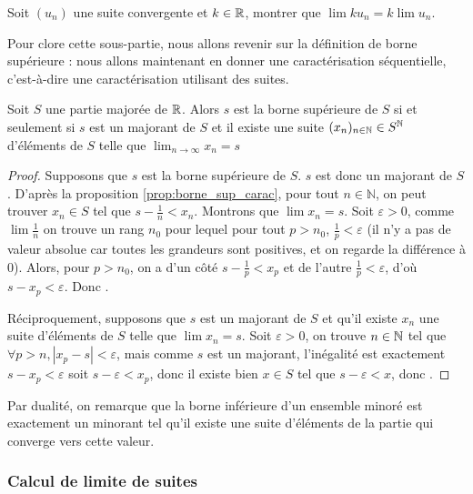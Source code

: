 \begin{exo}
    Soit $(u_n)$ une suite convergente et $k\in\mathbb{R}$, montrer que $\lim k u_n = k \lim u_n$.
\end{exo}

Pour clore cette sous-partie, nous allons revenir sur la définition de borne supérieure : nous allons maintenant en donner une caractérisation séquentielle, c'est-à-dire une caractérisation utilisant des suites.

\begin{prop}
    Soit $S$ une partie majorée de $\mathbb{R}$. Alors $s$ est la borne supérieure de $S$ si et seulement si $s$ est un majorant de $S$ et il existe une suite $(x_n)_{n\in\mathbb{N}}\in S^{\mathbb{N}}$ d'éléments de $S$ telle que $\displaystyle{\lim_{n\to\infty} x_n = s}$
\end{prop}

\begin{proof}
    Supposons que $s$ est la borne supérieure de $S$. $s$ est donc un majorant de $S$. D'après la proposition \ref{prop:borne_sup_carac}, pour tout $n\in\mathbb N$, on peut trouver $x_n\in S$ tel que $s-\frac{1}{n} < x_n$. Montrons que $\lim x_n = s$. Soit $\varepsilon > 0$, comme $\lim \frac{1}{n}$ on trouve un rang $n_0$ pour lequel pour tout $p > n_0$, $\frac{1}{p} < \varepsilon$ (il n'y a pas de valeur absolue car toutes les grandeurs sont positives, et on regarde la différence à $0$). Alors, pour $p > n_0$, on a d'un côté $s-\frac{1}{p} < x_p$ et de l'autre $\frac{1}{p} < \varepsilon$, d'où $s-x_p < \varepsilon$. Donc .

    Réciproquement, supposons que $s$ est un majorant de $S$ et qu'il existe $x_n$ une suite d'éléments de $S$ telle que $\lim x_n = s$. Soit $\varepsilon > 0$, on trouve $n\in\mathbb{N}$ tel que $\forall p > n, |x_p-s| < \varepsilon$, mais comme $s$ est un majorant, l'inégalité est exactement $s - x_p < \varepsilon$ soit $s-\varepsilon < x_p$, donc il existe bien $x\in S$ tel que $s-\varepsilon < x$, donc .
\end{proof}

\begin{rmk}
    Par dualité, on remarque que la borne inférieure d'un ensemble minoré est exactement un minorant tel qu'il existe une suite d'éléments de la partie qui converge vers cette valeur.
\end{rmk}

\subsubsection{Calcul de limite de suites}

